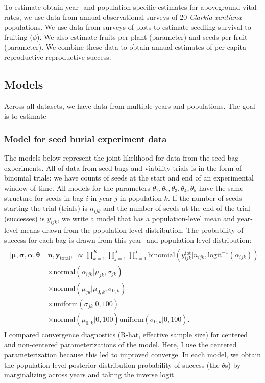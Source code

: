 \documentclass[12pt, oneside, titlepage]{article}   	%
\begin{document}
To estimate obtain year- and population-specific estimates for aboveground vital rates, we use data from annual observational surveys of 20 \textit{Clarkia xantiana} populations. We use data from surveys of plots to estimate seedling survival to fruiting ($\phi$). We also estimate fruits per plant (parameter) and seeds per fruit (parameter). We combine these data to obtain annual estimates of per-capita reproductive reproductive success.

\subsection*{Models}

Across all datasets, we have data from multiple years and populations. The goal is to estimate 

\subsubsection*{Model for seed burial experiment data}

The models below represent the joint likelihood for data from the seed bag experiments. All of data from seed bags and viability trials is in the form of binomial trials: we have counts of seeds at the start and end of an experimental window of time. All models for the parameters $\theta_1, \theta_2, \theta_3, \theta_4, \theta_5$ have the same structure for seeds in bag $i$ in year $j$ in population $k$. If the number of seeds starting the trial (trials) is $n_{ijk}$ and the number of seeds at the end of the trial (successes) is $y_{ijk}$, we write a model that has a population-level mean and year-level means drawn from the population-level distribution. The probability of success for each bag is drawn from this year- and population-level distribution:
%
\begin{align}
  \begin{split}
 [ \bm{\mu}, \bm{\sigma}, \bm{\alpha}, \bm{\theta} | & \bm{n}, \bm{y_{\mathrm{total}}},  ] \propto  \prod_{k=1}^{K} \prod_{j=1}^{J} \prod_{i=1}^{I} 
   \mathrm{binomial} ( y^{\mathrm{tot}}_{ijk} | n_{ijk}, \mathrm{logit}^{-1}( \alpha_{ijk} ) ) 
   \\ & \times \mathrm{normal} ( \alpha_{ijk}  | \mu_{jk}, \sigma{_{jk} })
  \\ & \times \mathrm{normal} ( \mu_{jk}  | \mu_{0,k}, \sigma{_{0,k} })
  \\ & \times \mathrm{uniform} ( \sigma_{jk} | 0,100)
  \\ & \times \mathrm{normal} ( \mu_{0,k} | 0 , 100 ) \mathrm{uniform} ( \sigma_{0,k} | 0,100).
  \end{split}
\end{align}
%
I compared convergence diagnostics (R-hat, effective sample size) for centered and non-centered parameterizations of the model. Here, I use the centered parameterization because this led to improved converge. In each model, we obtain the population-level posterior distribution probability of success (the $\theta$s) by marginalizing across years and taking the inverse logit.
\end{document}
